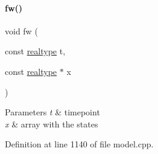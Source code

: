 \paragraph{\texorpdfstring{fw()}{fw()}\hspace{0.1cm}{\footnotesize\ttfamily [1/2]}}
{\footnotesize\ttfamily void fw (\begin{DoxyParamCaption}\item[{const \mbox{\hyperlink{namespaceamici_a1bdce28051d6a53868f7ccbf5f2c14a3}{realtype}}}]{t,  }\item[{const \mbox{\hyperlink{namespaceamici_a1bdce28051d6a53868f7ccbf5f2c14a3}{realtype}} $\ast$}]{x }\end{DoxyParamCaption})}


\begin{DoxyParams}{Parameters}
{\em t} & timepoint \\
\hline
{\em x} & array with the states \\
\hline
\end{DoxyParams}


Definition at line 1140 of file model.\+cpp.

